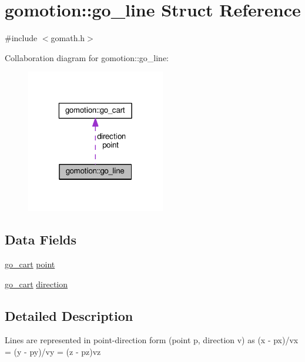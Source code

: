 \hypertarget{structgomotion_1_1go__line}{\section{gomotion\-:\-:go\-\_\-line Struct Reference}
\label{structgomotion_1_1go__line}
}


{\ttfamily \#include $<$gomath.\-h$>$}



Collaboration diagram for gomotion\-:\-:go\-\_\-line\-:\nopagebreak
\begin{figure}[H]
\begin{center}
\leavevmode
\includegraphics[width=172pt]{d1/df8/structgomotion_1_1go__line__coll__graph}
\end{center}
\end{figure}
\subsection*{Data Fields}
\begin{DoxyCompactItemize}
\item 
\hyperlink{structgomotion_1_1go__cart}{go\-\_\-cart} \hyperlink{structgomotion_1_1go__line_a074cee7c1f473ac10092e38e3f73699e}{point}
\item 
\hyperlink{structgomotion_1_1go__cart}{go\-\_\-cart} \hyperlink{structgomotion_1_1go__line_ae6dce3a84c609e8ef3c3d97b8a5bc0ab}{direction}
\end{DoxyCompactItemize}


\subsection{Detailed Description}
Lines are represented in point-\/direction form (point p, direction v) as (x -\/ px)/vx = (y -\/ py)/vy = (z -\/ pz)vz 

